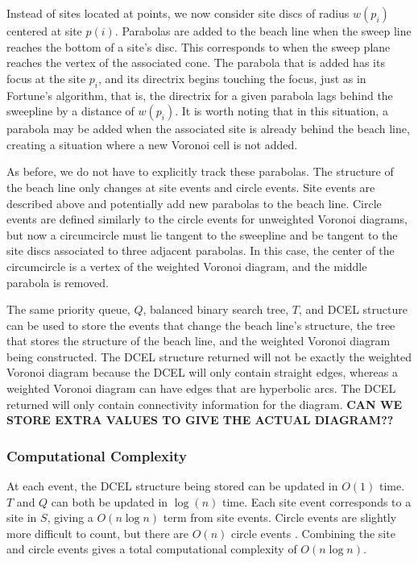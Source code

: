 \documentclass[a4paper, 11pt]{article}
\begin{document}
Instead of sites located at points, we now consider site discs of radius $w(p_i)$ centered at site $p(i)$. Parabolas are added to the beach
line when the sweep line reaches the bottom of a site's disc. This corresponds to when the sweep plane reaches the vertex of the associated cone. The
parabola that is added has its focus at the site $p_i$, and its directrix begins touching the focus, just as in Fortune's algorithm, that is, the
directrix for a given parabola lags behind the sweepline by a distance of $w(p_i)$. It is worth noting that in this situation, a parabola may be added
when the associated site is already behind the beach line, creating a situation where a new Voronoi cell is not added.

As before, we do not have to explicitly track these parabolas. The structure of the beach line only changes at site events and circle events. Site
events are described above and potentially add new parabolas to the beach line. Circle events are defined similarly to the circle events for
unweighted Voronoi diagrams, but now a circumcircle must lie tangent to the sweepline and be tangent to the site discs associated to three adjacent
parabolas. In this case, the center of the circumcircle is a vertex of the weighted Voronoi diagram, and the middle parabola is removed.

The same priority queue, $Q$, balanced binary search tree, $T$, and DCEL structure can be used to store the events that change the beach line's
structure, the tree that stores the structure of the beach line, and the weighted Voronoi diagram being constructed. The DCEL structure returned will
not be exactly the weighted Voronoi diagram because the DCEL will only contain straight edges, whereas a weighted Voronoi diagram can have edges that
are hyperbolic arcs. The DCEL returned will only contain connectivity information for the diagram. \textbf{CAN WE STORE EXTRA VALUES TO GIVE THE
ACTUAL DIAGRAM??}

\subsubsection{Computational Complexity}

At each event, the DCEL structure being stored can be updated in $O(1)$ time. $T$ and $Q$ can both be updated in $\log(n)$ time. Each site event corresponds to a site in $S$, giving a $O(n \log n)$ term from site events. Circle
events are slightly more difficult to count, but there are $O(n)$ circle events \cite{comp_geom}. Combining the site and circle events gives a total
computational complexity of $O(n \log n)$.
\end{document}
